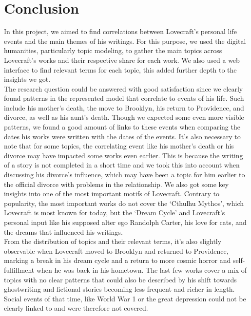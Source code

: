 \section{Conclusion}

In this project, we aimed to find correlations between Lovecraft’s personal life events and the main 
themes of his writings. For this purpose, we used the digital humanities, particularly topic modeling, 
to gather the main topics across Lovecraft’s works and their respective share for each work. We also 
used a web interface to find relevant terms for each topic, this added further depth to the insights 
we got.\\

The research question could be answered with good satisfaction since we clearly found patterns in 
the represented model that correlate to events of his life. Such include his mother’s death, the 
move to Brooklyn, his return to Providence, and divorce, as well as his aunt’s death. Though we 
expected some even more visible patterns, we found a good amount of links to these events when 
comparing the dates his works were written with the dates of the events. It’s also necessary to 
note that for some topics, the correlating event like his mother’s death or his divorce may have 
impacted some works even earlier. This is because the writing of a story is not completed in a 
short time and we took this into account when discussing his divorce’s influence, which may have 
been a topic for him earlier to the official divorce with problems in the relationship. We also 
got some key insights into one of the most important motifs of Lovecraft. Contrary to popularity, 
the most important works do not cover the ‘Cthulhu Mythos’, which Lovecraft is most known for today, 
but the ‘Dream Cycle’ and Lovecraft’s personal input like his supposed alter ego Randolph Carter, 
his love for cats, and the dreams that influenced his writings.\\

From the distribution of topics and their relevant terms, it’s also slightly observable when 
Lovecraft moved to Brooklyn and returned to Providence, marking a break in his dream cycle and 
a return to more cosmic horror and self-fulfillment when he was back in his hometown. The last 
few works cover a mix of topics with no clear patterns that could also be described by his shift 
towards ghostwriting and fictional stories becoming less frequent and richer in length. Social 
events of that time, like World War 1 or the great depression could not be clearly linked to and 
were therefore not covered.\\

